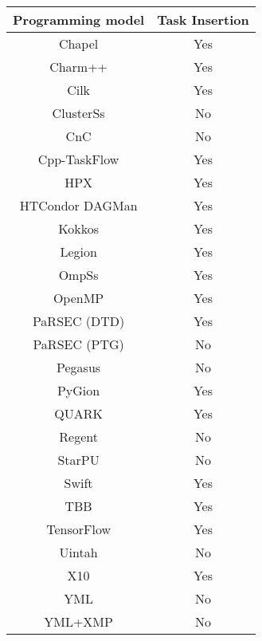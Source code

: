 \begin{tabular}{cc}
\hline
Programming model & Task Insertion \\
\hline
Chapel & Yes\\
Charm++ & Yes\\
Cilk & Yes\\
ClusterSs & No\\
CnC & No\\
Cpp-TaskFlow & Yes\\
HPX & Yes\\
HTCondor DAGMan & Yes\\
Kokkos & Yes\\
Legion & Yes\\
OmpSs & Yes\\
OpenMP & Yes\\
PaRSEC (DTD) & Yes\\
PaRSEC (PTG) & No\\
Pegasus & No\\
PyGion & Yes\\
QUARK & Yes\\
Regent & No\\
StarPU & No\\
Swift & Yes\\
TBB & Yes\\
TensorFlow & Yes\\
Uintah & No\\
X10 & Yes\\
YML & No\\
YML+XMP & No\\
\hline
\end{tabular}

